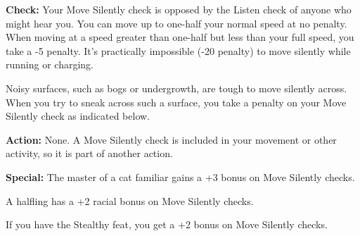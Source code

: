 \textbf{Check:} Your Move Silently check is opposed by the Listen check of anyone who might hear you. You can move up to one-half your normal speed at no penalty. When moving at a speed greater than one-half but less than your full speed, you take a -5 penalty. It’s practically impossible (-20 penalty) to move silently while running or charging.

Noisy surfaces, such as bogs or undergrowth, are tough to move silently across. When you try to sneak across such a surface, you take a penalty on your Move Silently check as indicated below.


\textbf{Action:} None. A Move Silently check is included in your movement or other activity, so it is part of another action.

\textbf{Special:} The master of a cat familiar gains a +3 bonus on Move Silently checks.

A halfling has a +2 racial bonus on Move Silently checks.

If you have the Stealthy feat, you get a +2 bonus on Move Silently checks.